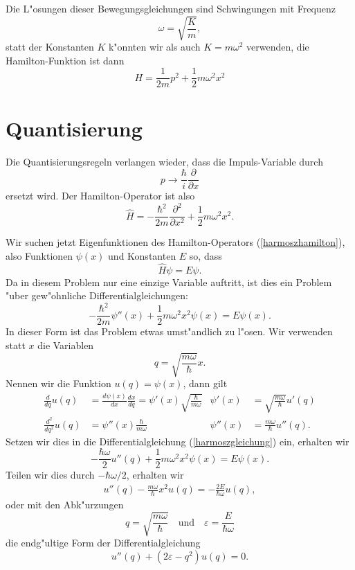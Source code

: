 Die L"osungen dieser Bewegungsgleichungen sind Schwingungen mit 
Frequenz
\[
\omega = \sqrt{\frac{K}{m}},
\]
statt der Konstanten $K$ k"onnten wir als auch $K=m\omega^2$ verwenden,
die Hamilton-Funktion ist dann
\[
H=\frac1{2m}p^2+\frac12m\omega^2x^2
\]


\section{Quantisierung}
Die Quantisierungsregeln verlangen wieder, dass die Impuls-Variable
durch
\[
p\rightarrow\frac{\hbar}{i}\frac{\partial}{\partial x}
\]
ersetzt wird. Der Hamilton-Operator ist also
\begin{equation}
\hat H
=
-\frac{\hbar^2}{2m}
\frac{\partial^2}{\partial x^2}
+\frac12m\omega^2x^2.
\label{harmoszhamilton}
\end{equation}

Wir suchen jetzt Eigenfunktionen des Hamilton-Operators (\ref{harmoszhamilton}),
also Funktionen $\psi(x)$ und Konstanten $E$ so, dass
\[
\hat H\psi=E\psi.
\]
Da in diesem Problem nur eine einzige Variable auftritt, ist dies ein
Problem "uber gew"ohnliche Differentialgleichungen:
\begin{equation}
-\frac{\hbar^2}{2m} \psi''(x)+\frac12m\omega^2x^2\psi(x)=E\psi(x).
\label{harmoszgleichung}
\end{equation}
In dieser Form ist das Problem etwas umst"andlich zu l"osen.
Wir verwenden statt $x$ die Variablen 
\[
q=\sqrt{\frac{m\omega}{\hbar}}x.
\]
Nennen wir die Funktion $u(q)=\psi(x)$, dann gilt
\begin{align*}
\frac{d}{dq}u(q)&=\frac{d\psi(x)}{dx}\frac{dx}{dq}
=\psi'(x)\sqrt{\frac{\hbar}{m\omega}}
&
\psi'(x)&=\sqrt{\frac{m\omega}{\hbar}}u'(q)
\\
\frac{d^2}{dq^2}u(q)&=\psi''(x)\frac{\hbar}{m\omega}
&
\psi''(x)&=\frac{m\omega}{\hbar}u''(q).
\end{align*}
Setzen wir dies in die Differentialgleichung (\ref{harmoszgleichung})
ein, erhalten wir
\begin{equation}
-\frac{\hbar\omega}{2} u''(q)
+\frac12m\omega^2x^2\psi(x)=E\psi(x).
\end{equation}
Teilen wir dies durch $-\hbar\omega/2$, erhalten wir
\begin{align*}
u''(q) -\frac{m\omega}{\hbar}x^2u(q)=-\frac{2E}{\hbar\omega}u(q),
\end{align*}
oder mit den Abk"urzungen
\[
q=\sqrt{\frac{m\omega}{\hbar}}
\quad\text{und}\quad
\varepsilon=\frac{E}{\hbar \omega}
\]
die endg"ultige Form der Differentialgleichung
\begin{equation}
u''(q)+(2\varepsilon-q^2) u(q)=0.
\label{harmq}
\end{equation}

